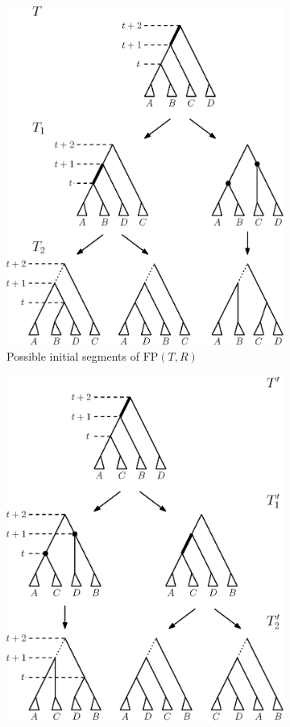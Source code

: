 \documentclass[11pt]{amsart}
\newcommand{\fp}{\mathrm{FP}}
\begin{document}
\begin{enumerate}[label = 1.{\arabic*}]
\begin{figure}[ht]
	\begin{subfigure}[b]{.45\textwidth}
		\centering
		\includegraphics[width=0.9\linewidth]{thm_fp_nni2a.eps}
		\vspace{12pt}
		\caption{Possible initial segments of $\fp(T, R)$}
		\label{fig:thm_fp_nni2a}
	\end{subfigure}
	\begin{subfigure}[b]{.45\textwidth}
		\centering
		\includegraphics[width=0.9\linewidth]{thm_fp_nni2b.eps}

\end{subfigure}
\end{figure}
\end{enumerate}
\end{document}
